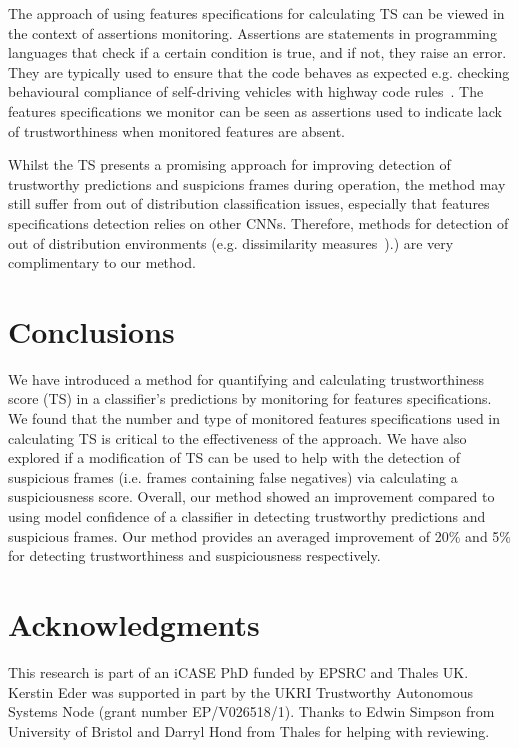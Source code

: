 The approach of using features specifications for calculating TS can be viewed in the context of assertions monitoring. 
%
Assertions are statements in programming languages that check if a certain condition is true, and if not, they raise an error.
%
They are typically used to ensure that the code behaves as expected e.g. checking behavioural compliance of self-driving vehicles with highway code rules~\cite{harper2021safety}.
%
The features specifications we monitor can be seen as assertions used to indicate lack of trustworthiness when monitored features are absent.

Whilst the TS presents a promising approach for improving detection of trustworthy predictions and suspicions frames during operation, the method may still suffer from out of distribution classification issues, especially that features specifications detection relies on other CNNs.
%
Therefore, methods for detection of out of distribution environments (e.g. dissimilarity measures~\cite{Hond2020}).) are very complimentary to our method.

\section{Conclusions} \label{sec:conclusions} 
We have introduced a method for quantifying and calculating trustworthiness score (TS) in a classifier's predictions by monitoring for features specifications.
%
We found that the number and type of monitored features specifications used in calculating TS is critical to the effectiveness of the approach.
%
We have also explored if a modification of TS can be used to help with the detection of suspicious frames (i.e. frames containing false negatives) via calculating a suspiciousness score. 
%
Overall, our method showed an improvement compared to using model confidence of a classifier in detecting trustworthy predictions and suspicious frames. 
%
Our method provides an averaged improvement of 20\% and 5\% for detecting trustworthiness and suspiciousness respectively. 


\section*{Acknowledgments}
This research is part of an iCASE PhD funded by EPSRC and Thales UK. 
Kerstin Eder was supported in part by the UKRI Trustworthy Autonomous Systems Node (grant number EP/V026518/1).
%
Thanks to Edwin Simpson from University of Bristol and Darryl Hond from Thales for helping with reviewing.
